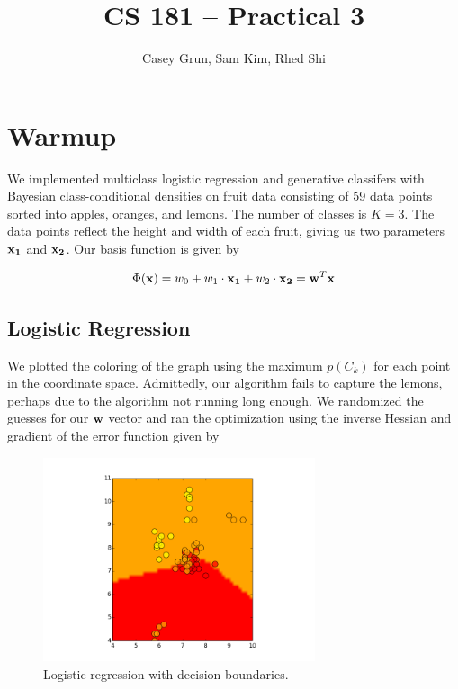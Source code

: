 \documentclass[11pt]{amsart}
\title{CS 181 -- Practical 3}
\author{Casey Grun, Sam Kim, Rhed Shi}
\begin{document}
\maketitle

\section{Warmup}

We implemented multiclass logistic regression and generative classifers with Bayesian class-conditional densities on fruit data consisting of 59 data points sorted into apples, oranges, and lemons. The number of classes is $K = 3$. The data points reflect the height and width of each fruit, giving us two parameters $\bold{x_1}$ and $\bold{x_2}$. Our basis function is given by

$$ \Phi(\bold{x}) = w_0 + w_1 \cdot \bold{x_1} + w_2 \cdot \bold{x_2}  = \bold{w}^T \bold{x} $$

\subsection{Logistic Regression}

%
%

We plotted the coloring of the graph using the maximum $p(C_k)$ for each point in the coordinate space. Admittedly, our algorithm fails to capture the lemons, perhaps due to the algorithm not running long enough. We randomized the guesses for our $\bold{w}$ vector and ran the optimization using the inverse Hessian and gradient of the error function given by

\begin{figure}
  \includegraphics[width=8cm]{figure_2.png}
  \caption{Logistic regression with decision boundaries.}
\end{figure}
\end{document}
